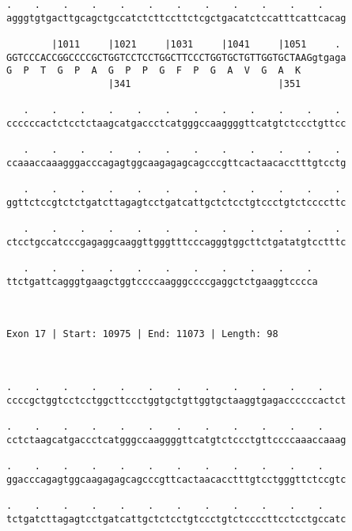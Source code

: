 \documentclass{article}
\begin{document}
\begin{Verbatim}
.    .    .    .    .    .    .    .    .    .    .    .    
agggtgtgacttgcagctgccatctcttccttctcgctgacatctccatttcattcacag
                                                            
        |1011     |1021     |1031     |1041     |1051     . 
GGTCCCACCGGCCCCGCTGGTCCTCCTGGCTTCCCTGGTGCTGTTGGTGCTAAGgtgaga
G  P  T  G  P  A  G  P  P  G  F  P  G  A  V  G  A  K        
                  |341                          |351        
  
   .    .    .    .    .    .    .    .    .    .    .    . 
ccccccactctcctctaagcatgaccctcatgggccaaggggttcatgtctccctgttcc
                                                            
   .    .    .    .    .    .    .    .    .    .    .    . 
ccaaaccaaagggacccagagtggcaagagagcagcccgttcactaacacctttgtcctg
                                                            
   .    .    .    .    .    .    .    .    .    .    .    . 
ggttctccgtctctgatcttagagtcctgatcattgctctcctgtccctgtctccccttc
                                                            
   .    .    .    .    .    .    .    .    .    .    .    . 
ctcctgccatcccgagaggcaaggttgggtttcccagggtggcttctgatatgtcctttc
                                                            
   .    .    .    .    .    .    .    .    .    .    . 
ttctgattcagggtgaagctggtccccaagggccccgaggctctgaaggtcccca
                                                       
                                                       
 
Exon 17 | Start: 10975 | End: 11073 | Length: 98



.    .    .    .    .    .    .    .    .    .    .    .    
ccccgctggtcctcctggcttccctggtgctgttggtgctaaggtgagaccccccactct
                                                            
.    .    .    .    .    .    .    .    .    .    .    .    
cctctaagcatgaccctcatgggccaaggggttcatgtctccctgttccccaaaccaaag
                                                            
.    .    .    .    .    .    .    .    .    .    .    .    
ggacccagagtggcaagagagcagcccgttcactaacacctttgtcctgggttctccgtc
                                                            
.    .    .    .    .    .    .    .    .    .    .    .    
tctgatcttagagtcctgatcattgctctcctgtccctgtctccccttcctcctgccatc
                                                            

\end{Verbatim}
\end{document}
